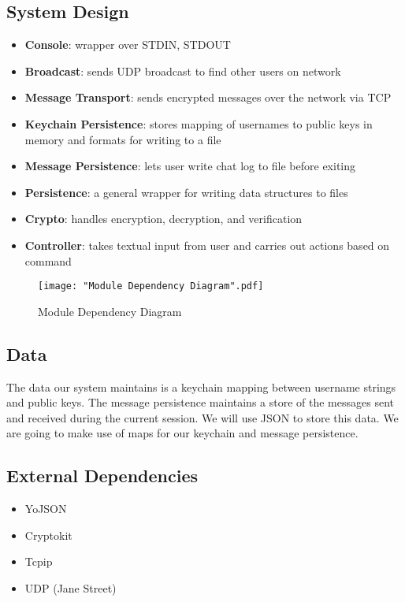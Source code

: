 \documentclass{scrartcl}
\begin{document}
\subsection{System Design}
\begin{itemize}
	\item \textbf{Console}: wrapper over STDIN, STDOUT
	\item \textbf{Broadcast}: sends UDP broadcast to find other users on network
	\item \textbf{Message Transport}: sends encrypted messages over the network via TCP
	\item \textbf{Keychain Persistence}: stores mapping of usernames to public keys in memory and formats for writing to a file 
	\item \textbf{Message Persistence}: lets user write chat log to file before exiting
	\item \textbf{Persistence}: a general wrapper for writing data structures to files
	\item \textbf{Crypto}: handles encryption, decryption, and verification
	\item \textbf{Controller}: takes textual input from user and carries out actions based on command 
\end{itemize}
\begin{figure}[H]
	\texttt{[image: "Module Dependency Diagram".pdf]}
	\caption{Module Dependency Diagram}
\end{figure}
\subsection{Data}
The data our system maintains is a keychain mapping between username strings and public keys. The message persistence maintains a store of the messages sent and received during the current session. We will use JSON to store this data. We are going to make use of maps for our keychain and message persistence. 

\subsection{External Dependencies}
\begin{itemize}
	\item YoJSON
	\item Cryptokit
	\item Tcpip
	\item UDP (Jane Street)
\end{itemize}
\end{document}
